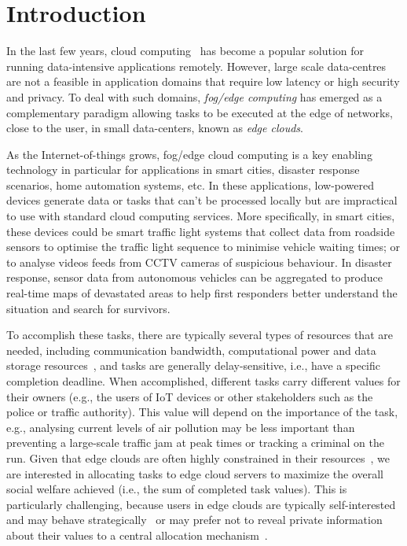 \section{Introduction}\label{sec:introduction}
In the last few years, cloud computing~\cite{cloud_cite} has become a popular solution for running data-intensive
applications remotely. However, large scale data-centres are not a feasible in application domains that require low
latency or high security and privacy. To deal with such domains, \emph{fog/edge computing} has emerged as a
complementary paradigm allowing tasks to be executed at the edge of networks, close to the user, in small data-centers,
known as \emph{edge clouds}.

As the Internet-of-things grows, fog/edge cloud computing is a key enabling technology in particular for applications
in smart cities, disaster response scenarios, home automation systems, etc. In these applications, low-powered devices
generate data or tasks that can't be processed locally but are impractical to use with standard cloud computing
services. More specifically, in smart cities, these devices could be smart traffic light systems that collect data from
roadside sensors to optimise the traffic light sequence to minimise vehicle waiting times; or to analyse videos feeds
from CCTV cameras of suspicious behaviour. In disaster response, sensor data from autonomous vehicles can be aggregated
to produce real-time maps of devastated areas to help first responders better understand the situation and search for
survivors.

To accomplish these tasks, there are typically several types of resources that are needed, including communication
bandwidth, computational power and data storage resources~\cite{vaji_infocom}, and tasks are generally
delay-sensitive, i.e., have a specific completion deadline. When accomplished, different tasks carry different values
for their owners (e.g., the users of IoT devices or other stakeholders such as the police or traffic authority). This
value will depend on the importance of the task, e.g., analysing current levels of air pollution may be less important
than preventing a large-scale traffic jam at peak times or tracking a criminal on the run. Given that edge clouds are
often highly constrained in their resources~\cite{edge_limitations}, we are interested in allocating tasks to edge
cloud servers to maximize the overall social welfare achieved (i.e., the sum of completed task values). This is
particularly challenging, because users in edge clouds are typically self-interested and may behave
strategically~\cite{Bi2019} or may prefer not to reveal private information about their values to a central allocation
mechanism~\cite{Pai2013}.

